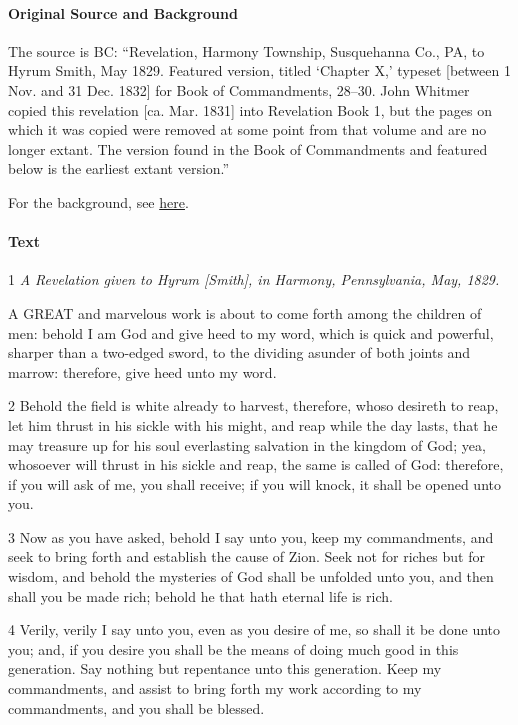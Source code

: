 			\paragraph{Original Source and Background}
			
				The source is BC: ``Revelation, Harmony Township, Susquehanna Co., PA, to Hyrum Smith, May 1829. Featured version, titled `Chapter X,' typeset [between 1 Nov. and 31 Dec. 1832] for Book of Commandments, 28--30. John Whitmer copied this revelation [ca. Mar. 1831] into Revelation Book 1, but the pages on which it was copied were removed at some point from that volume and are no longer extant. The version found in the Book of Commandments and featured below is the earliest extant version.''
				
				For the background, see \hyperref[DC11-HB]{here}.
			
			\paragraph{Text}

				1 \textit{A Revelation given to Hyrum [Smith], in Harmony, Pennsylvania, May, 1829.}

				A GREAT and marvelous work is about to come forth among the children of men: behold I am God and give heed to my word, which is quick and powerful, sharper than a two-edged sword, to the dividing asunder of both joints and marrow: therefore, give heed unto my word.

				2 Behold the field is white already to harvest, therefore, whoso desireth to reap, let him thrust in his sickle with his might, and reap while the day lasts, that he may treasure up for his soul everlasting salvation in the kingdom of God; yea, whosoever will thrust in his sickle and reap, the same is called of God: therefore, if you will ask of me, you shall receive; if you will knock, it shall be opened unto you.

				3 Now as you have asked, behold I say unto you, keep my commandments, and seek to bring forth and establish the cause of Zion. Seek not for riches but for wisdom, and behold the mysteries of God shall be unfolded unto you, and then shall you be made rich; behold he that hath eternal life is rich.

				4 Verily, verily I say unto you, even as you desire of me, so shall it be done unto you; and, if you desire you shall be the means of doing much good in this generation. Say nothing but repentance unto this generation. Keep my commandments, and assist to bring forth my work according to my commandments, and you shall be blessed.

